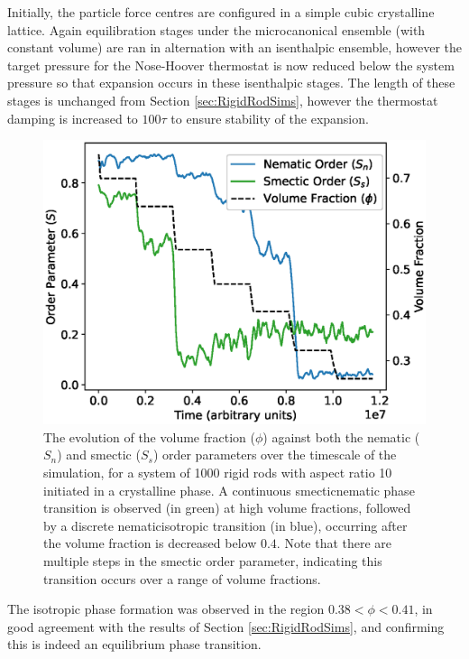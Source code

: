 \documentclass[11pt, a4paper]{article} %
\begin{document}
Initially, the particle force centres are configured in a simple cubic crystalline lattice. Again equilibration stages under the microcanonical ensemble (with constant volume) are ran in alternation with an isenthalpic ensemble, however the target pressure for the Nose-Hoover thermostat is now reduced below the system pressure so that expansion occurs in these isenthalpic stages. The length of these stages is unchanged from Section \ref{sec:RigidRodSims}, however the thermostat damping is increased to $100\tau$ to ensure stability of the expansion.

\begin{figure} [h!]
	\centering
	\includegraphics[width=0.7\linewidth]{Figures/rigidrod_cryorderparam}
	\caption{The evolution of the volume fraction ($\phi$) against both the nematic ($S_{n}$) and smectic ($S_{s}$) order parameters over the timescale of the simulation, for a system of 1000 rigid rods with aspect ratio 10 initiated in a crystalline phase. A continuous smectic\textendash nematic phase transition is observed (in green) at high volume fractions, followed by a discrete nematic\textendash isotropic transition (in blue), occurring after the volume fraction is decreased below $0.4$. Note that there are multiple steps in the smectic order parameter, indicating this transition occurs over a range of volume fractions.}
	\label{fig:rr_crystalorder}
\end{figure} %


The isotropic phase formation was observed in the region $0.38 < \phi< 0.41$, in good agreement with the results of Section \ref{sec:RigidRodSims}, and confirming this is indeed an equilibrium phase transition. 
\end{document}
